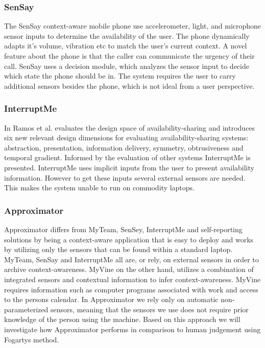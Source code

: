 \documentclass{sigchi}
\begin{document}
\subsubsection{SenSay}
The SenSay context-aware mobile phone \cite{siewiorek2003sensay} use accelerometer, light, and microphone sensor inputs to determine the availability of the user.
The phone dynamically adapts it’s volume, vibration etc to match the user's current context.
A novel feature about the phone is that the caller can communicate the urgency of their call.
SenSay uses a decision module, which analyzes the sensor input to decide which state the phone should be in.
The system requires the user to carry additional sensors besides the phone, which is not ideal from a user perspective.

\subsubsection{InterruptMe}
In \cite{hincapie2011design} Ramos et al. evaluates the design space of availability-sharing and introduces six new relevant design dimensions for evaluating availability-sharing systems: abstraction, presentation, information delivery, symmetry, obtrusiveness and temporal gradient.
Informed by the evaluation of other systems InterruptMe is presented.
InterruptMe uses implicit inputs from the user to present availability information.
However to get these inputs several external sensors are needed.
This makes the system unable to run on commodity laptops.

\subsubsection{Approximator}
Approximator differs from MyTeam, SenSey, InterruptMe and self-reporting solutions by being a context-aware application that is easy to deploy and works by utilizing only the sensors that can be found within a standard laptop.
MyTeam, SenSay and InterruptMe all are, or rely, on external sensors in order to archive context-awareness.
MyVine on the other hand, utilizes a combination of integrated sensors and contextual information to infer context-awareness.
MyVine requires information such as computer programs associated with work and access to the persons calendar.
In Approximator we rely only on automatic non-parameterized sensors, meaning that the sensors we use does not require prior knowledge of the person using the machine.
Based on this approach we will investigate how Approximator performs in comparison to human judgement using Fogartys method.
\end{document}
